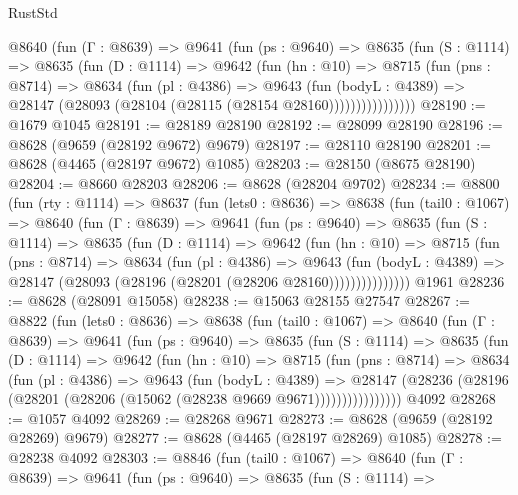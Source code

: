 \begin{lexlean}{RustStd}
\begin{coremodule}
          @8640
            (fun (Γ : @8639) =>
            @9641
              (fun (ps : @9640) =>
              @8635
                (fun (S : @1114) =>
                @8635
                  (fun (D : @1114) =>
                  @9642
                    (fun (hn : @10) =>
                    @8715
                      (fun (pns : @8714) =>
                      @8634
                        (fun (pl : @4386) =>
                        @9643
                          (fun (bodyL : @4389) =>
                          @28147 (@28093 (@28104 (@28115 (@28154 @28160))))))))))))))))
@28190 := @1679 @1045
@28191 := @28189 @28190
@28192 := @28099 @28190
@28196 := @8628 (@9659 (@28192 @9672) @9679)
@28197 := @28110 @28190
@28201 := @8628 (@4465 (@28197 @9672) @1085)
@28203 := @28150 (@8675 @28190)
@28204 := @8660 @28203
@28206 := @8628 (@28204 @9702)
@28234 := @8800
    (fun (rty : @1114) =>
    @8637
      (fun (lets0 : @8636) =>
      @8638
        (fun (tail0 : @1067) =>
        @8640
          (fun (Γ : @8639) =>
          @9641
            (fun (ps : @9640) =>
            @8635
              (fun (S : @1114) =>
              @8635
                (fun (D : @1114) =>
                @9642
                  (fun (hn : @10) =>
                  @8715
                    (fun (pns : @8714) =>
                    @8634
                      (fun (pl : @4386) =>
                      @9643
                        (fun (bodyL : @4389) =>
                        @28147 (@28093 (@28196 (@28201 (@28206 @28160)))))))))))))))
    @1961
@28236 := @8628 (@28091 @15058)
@28238 := @15063 @28155 @27547
@28267 := @8822
    (fun (lets0 : @8636) =>
    @8638
      (fun (tail0 : @1067) =>
      @8640
        (fun (Γ : @8639) =>
        @9641
          (fun (ps : @9640) =>
          @8635
            (fun (S : @1114) =>
            @8635
              (fun (D : @1114) =>
              @9642
                (fun (hn : @10) =>
                @8715
                  (fun (pns : @8714) =>
                  @8634
                    (fun (pl : @4386) =>
                    @9643
                      (fun (bodyL : @4389) =>
                      @28147
                        (@28236 (@28196 (@28201 (@28206 (@15062 (@28238 @9669 @9671))))))))))))))))
    @4092
@28268 := @1057 @4092
@28269 := @28268 @9671
@28273 := @8628 (@9659 (@28192 @28269) @9679)
@28277 := @8628 (@4465 (@28197 @28269) @1085)
@28278 := @28238 @4092
@28303 := @8846
    (fun (tail0 : @1067) =>
    @8640
      (fun (Γ : @8639) =>
      @9641
        (fun (ps : @9640) =>
        @8635
          (fun (S : @1114) =>

\end{coremodule}
\end{lexlean}
